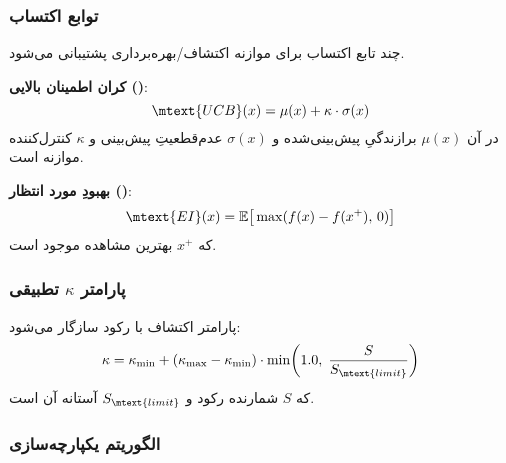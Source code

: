 \subsubsection{توابع اکتساب}

چند تابع اکتساب برای موازنه اکتشاف/بهره‌برداری پشتیبانی می‌شود.

\textbf{کران اطمینان بالایی ()}:
\begin{equation}\label{Eq.neural_ucb}
\mtext{UCB}(x) = \mu(x) + \kappa \cdot \sigma(x)
\end{equation}
در آن \(\mu(x)\) برازندگیِ پیش‌بینی‌شده و \(\sigma(x)\) عدم‌قطعیتِ پیش‌بینی و \(\kappa\) کنترل‌کننده موازنه است.

\textbf{بهبودِ مورد انتظار ()}:
\begin{equation}\label{Eq.neural_ei}
\mtext{EI}(x) = \mathbb{E}\big[\max(f(x) - f(x^{+}),\,0)\big]
\end{equation}
که \(x^{+}\) بهترین مشاهده موجود است.

\subsubsection{پارامتر \(\kappa\) تطبیقی}

پارامتر اکتشاف با رکود سازگار می‌شود:
\begin{equation}\label{Eq.adaptive_beta}
\kappa = \kappa_{\min} + (\kappa_{\max} - \kappa_{\min}) \cdot \min\!\left(1.0,\; \frac{S}{S_{\mtext{limit}}}\right)
\end{equation}
که \(S\) شمارنده رکود و \(S_{\mtext{limit}}\) آستانه آن است.

\subsubsection{الگوریتم یکپارچه‌سازی}

